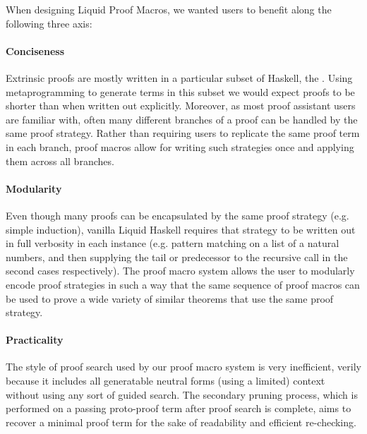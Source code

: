 

When designing Liquid Proof Macros, we wanted users to benefit along the following three axis:

\paragraph{Conciseness}
%
Extrinsic proofs are mostly written in a particular subset of Haskell,
the \LangB. Using metaprogramming to generate terms in this subset we
would expect proofs to be shorter than when written out explicitly.
%
%
Moreover, as most proof assistant users are familiar with, often many
different branches of a proof can be handled by the same proof
strategy. Rather than requiring users to replicate the same proof term
in each branch, proof macros allow for writing such strategies once
and applying them across all branches.

\paragraph{Modularity}
%
Even though many proofs can be encapsulated by the same proof strategy
(e.g. simple induction), vanilla Liquid Haskell requires that strategy
to be written out in full verbosity in each instance (e.g.  pattern
matching on a list of a natural numbers, and then supplying the tail
or predecessor to the recursive call in the second cases
respectively). The proof macro system allows the user to modularly
encode proof strategies in such a way that the same sequence of proof
macros can be used to prove a wide variety of similar theorems that
use the same proof strategy.

\paragraph{Practicality}
%
The style of proof search used by our proof macro system is very
inefficient, verily because it includes all generatable neutral forms
(using a limited) context without using any sort of guided search. The
secondary pruning process, which is performed on a passing proto-proof
term after proof search is complete, aims to recover a minimal proof
term for the sake of readability and efficient re-checking.

